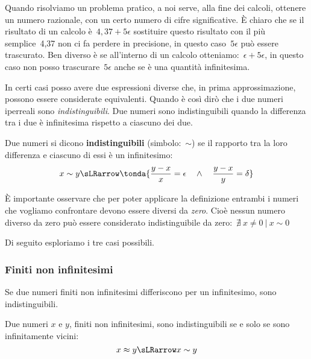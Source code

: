 Quando risolviamo un problema pratico, a noi serve, alla fine dei calcoli, 
ottenere un numero razionale, con un certo numero di cifre significative.
È chiaro che se il risultato di un calcolo è~\(4,37+5\epsilon\) sostituire 
questo risultato con il più semplice~4,37 non ci fa perdere in precisione, 
in questo caso~\(5\epsilon\) può essere trascurato.
Ben diverso è se all'interno di un calcolo  
otteniamo:~\(\epsilon+5\epsilon\), in questo caso non posso 
trascurare~\(5\epsilon\) anche se è una quantità infinitesima. 

In certi casi posso avere due espressioni diverse che, in prima 
approssimazione, possono essere considerate equivalenti. Quando è così dirò 
che i due numeri iperreali sono \emph{indistinguibili}.
Due numeri sono indistinguibili quando la differenza tra i due è 
infinitesima rispetto a ciascuno dei due.

\begin{definizione}
Due numeri si dicono \textbf{indistinguibili} (simbolo:~\(\sim\)) se il 
rapporto tra la loro differenza e ciascuno di essi è un infinitesimo:
\[x \sim y \sLRarrow 
\tonda{\frac{y-x}{x} = \epsilon \quad \wedge \quad \frac{y-x}{y} = \delta}
\]
\end{definizione}

\begin{osservazione}
 È importante osservare che per poter applicare la definizione entrambi i 
numeri che vogliamo confrontare devono essere diversi da \emph{zero}.
Cioè nessun numero diverso da zero può essere considerato indistinguibile 
da zero:~\(\nexists~x \neq 0 ~|~x \sim 0\)
\end{osservazione}

Di seguito esploriamo i tre casi possibili.

\subsubsection{Finiti non infinitesimi}
\label{subsubsec:insnum_finitini}

Se due numeri finiti non infinitesimi differiscono per un 
infinitesimo, sono indistinguibili.

\begin{teorema}
Due numeri \(x\) e \(y\), finiti non infinitesimi, 
sono indistinguibili se e solo se sono infinitamente vicini:
\[x \approx y \sLRarrow x \sim y\]
\end{teorema}

